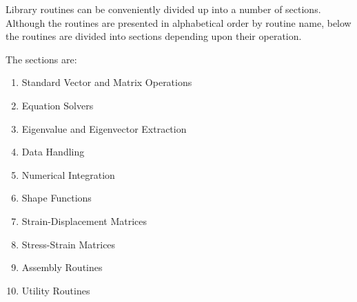 Library routines can be conveniently divided
up into a number of sections. Although the routines are
presented in alphabetical order by routine name,
below the routines are divided into sections
depending upon their operation.

\medskip\noindent
The sections are:
\begin{enumerate}
\item Standard Vector and Matrix Operations
\item Equation Solvers
\item Eigenvalue and Eigenvector Extraction
\item Data Handling
\item Numerical Integration
\item Shape Functions
\item Strain-Displacement Matrices
\item Stress-Strain Matrices
\item Assembly Routines
\item Utility Routines
\end{enumerate}
\newpage

